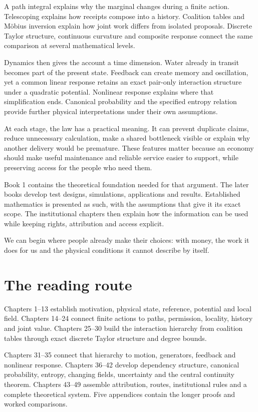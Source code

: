 A path integral explains why the marginal changes during a finite action. Telescoping explains how receipts compose into a history. Coalition tables and M\"obius inversion explain how joint work differs from isolated proposals. Discrete Taylor structure, continuous curvature and composite response connect the same comparison at several mathematical levels.

Dynamics then gives the account a time dimension. Water already in transit becomes part of the present state. Feedback can create memory and oscillation, yet a common linear response retains an exact pair-only interaction structure under a quadratic potential. Nonlinear response explains where that simplification ends. Canonical probability and the specified entropy relation provide further physical interpretations under their own assumptions.

At each stage, the law has a practical meaning. It can prevent duplicate claims, reduce unnecessary calculation, make a shared bottleneck visible or explain why another delivery would be premature. These features matter because an economy should make useful maintenance and reliable service easier to support, while preserving access for the people who need them.

Book 1 contains the theoretical foundation needed for that argument. The later books develop test designs, simulations, applications and results. Established mathematics is presented as such, with the assumptions that give it its exact scope. The institutional chapters then explain how the information can be used while keeping rights, attribution and access explicit.

We can begin where people already make their choices: with money, the work it does for us and the physical conditions it cannot describe by itself.

\section*{The reading route}
Chapters 1--13 establish motivation, physical state, reference, potential and local field. Chapters 14--24 connect finite actions to paths, permission, locality, history and joint value. Chapters 25--30 build the interaction hierarchy from coalition tables through exact discrete Taylor structure and degree bounds.

Chapters 31--35 connect that hierarchy to motion, generators, feedback and nonlinear response. Chapters 36--42 develop dependency structure, canonical probability, entropy, changing fields, uncertainty and the central continuity theorem. Chapters 43--49 assemble attribution, routes, institutional rules and a complete theoretical system. Five appendices contain the longer proofs and worked comparisons.

